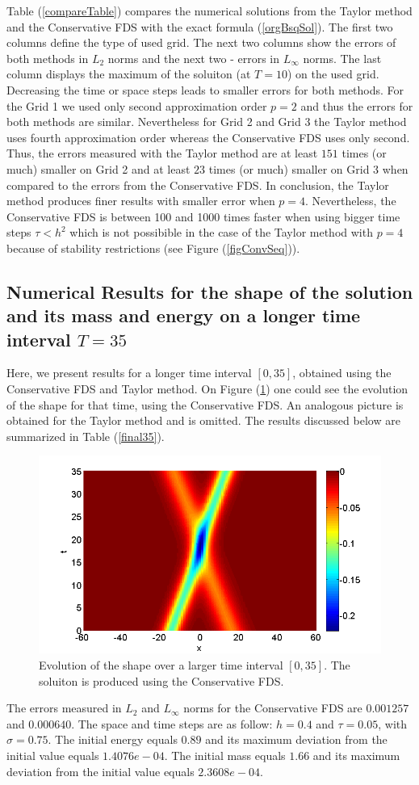 \documentclass[%
 aip,
cp,  
 amsmath,amssymb,
 reprint,
]{iopconfser}
\newcommand{\rf}[1]{(\ref{#1})}
\begin{document}
Table \rf{compareTable} compares the numerical solutions from the Taylor method and the Conservative FDS with the exact formula \rf{orgBsqSol}. The first two columns define the type of used grid. The next two columns show the errors of both methods in $L_2$ norms and the next two - errors in $L_\infty$ norms. The last column displays the maximum of the soluiton (at $T=10$) on the used grid. Decreasing the time or space steps leads to smaller errors
for both methods. For the Grid 1 we used only second approximation order $p=2$ and thus the errors for both methods are similar. Nevertheless for Grid 2 and Grid 3 the Taylor method uses fourth approximation order whereas 
the Conservative FDS uses only second. Thus, the errors measured with the Taylor method are at least $151$ times (or much) smaller on Grid 2 and at least $23$ times (or much) smaller on Grid 3 when compared to the errors from the Conservative FDS. In conclusion, the Taylor method produces finer results with smaller error when $p=4$. Nevertheless, the Conservative FDS is between 100 and 1000 times faster when using bigger time steps $\tau < h^2$ which is not possibible in the case of the Taylor method with $p=4$ because of stability restrictions (see Figure \rf{figConvSeq}).

\subsection{Numerical Results for the shape of the solution and its mass and energy on a longer time interval $T = 35$}

Here, we present results for a longer time interval $[0, 35]$, obtained using the Conservative FDS and Taylor method. On Figure \rf{sol35} one could see the evolution of the shape for that time, using the Conservative FDS. An analogous picture is obtained for the Taylor method and is omitted. The results discussed below are summarized in Table \rf{final35}. 

\begin{figure}[H]\vspace{0.2cm}
	\centering
	\includegraphics[width=0.7\linewidth]{solution2.png}
\caption{Evolution of the shape over a larger time interval $[0, 35]$. The soluiton is produced using the Conservative FDS.}
\label{sol35}
\end{figure}
The errors measured in $L_2$ and $L_\infty$ norms for the Conservative FDS are $0.001257$ and $0.000640$. The space and time steps are as follow: $h = 0.4$ and  $\tau = 0.05$, with $\sigma = 0.75$. The initial energy equals $0.89$ and its maximum deviation from the initial value equals $1.4076e-04$. The initial mass equals $1.66$ and its maximum deviation from the initial value equals $2.3608e-04$.
\end{document}
